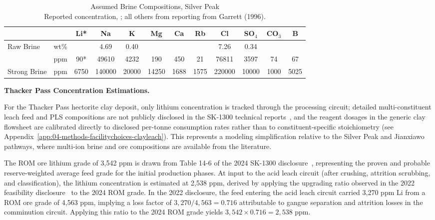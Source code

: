 \begin{table}[h]
\centering
\caption[Assumed Brine Compositions, Silver Peak]{Assumed Brine Compositions, Silver Peak \\
\small *Reported concentration, \cite{srkconsultingSECTechnicalReport2023a}; all others from \citet{garrettHandbookLithiumNatural2004} reporting from Garrett (1996).}
\label{tab:c-silverpeak-compositions}
\begin{tabular}{|l|l|c|c|c|c|c|c|c|c|c|c|}
\hline
 & & Li* & Na & K & Mg & Ca & Rb & Cl & SO$_4$ & CO$_3$ & B \\
\hline
\multirow{2}{*}{Raw Brine}
  & wt\% &       & 4.69   & 0.40  &       &      &      & 7.26   & 0.34  &      &      \\
\cline{2-12}
  & ppm  & 90*   & 49610  & 4232  & 190   & 450  & 21   & 76811  & 3597  & 74   & 67   \\
\hline
Strong Brine & ppm & 6750 & 140000 & 20000 & 14250 & 1688 & 1575 & 220000 & 10000 & 1000 & 5025 \\
\hline
\end{tabular}
\end{table}

\medskip
\noindent\textbf{Thacker Pass Concentration Estimations.}\quad

For the Thacker Pass hectorite clay deposit, only lithium concentration is tracked through the processing circuit; detailed multi-constituent leach feed and PLS compositions are not publicly disclosed in the SK-1300 technical reports~\cite{sgscanadaincSK1300Technical2024, rothFeasibilityStudyNational2022}, and the reagent dosages in the generic clay flowsheet are calibrated directly to disclosed per-tonne consumption rates rather than to constituent-specific stoichiometry (see Appendix~\ref{app:04-methods-facilitychoices-clayleach}). This represents a modeling simplification relative to the Silver Peak and Jianxiawo pathways, where multi-ion brine and ore compositions are available from the literature.

The ROM ore lithium grade of 3,542 ppm is drawn from Table 14-6 of the 2024 SK-1300 disclosure~\cite{sgscanadaincSK1300Technical2024}, representing the proven and probable reserve-weighted average feed grade for the initial production phases. At input to the acid leach circuit (after crushing, attrition scrubbing, and classification), the lithium concentration is estimated at 2,538 ppm, derived by applying the upgrading ratio observed in the 2022 feasibility disclosure~\cite{rothFeasibilityStudyNational2022} to the 2024 ROM grade. In the 2022 disclosure, the feed entering the acid leach circuit carried 3,270 ppm Li from a ROM ore grade of 4,563 ppm, implying a loss factor of $3,270/4,563 = 0.716$ attributable to gangue separation and attrition losses in the comminution circuit. Applying this ratio to the 2024 ROM grade yields $3,542 \times 0.716 = 2,538$ ppm.

